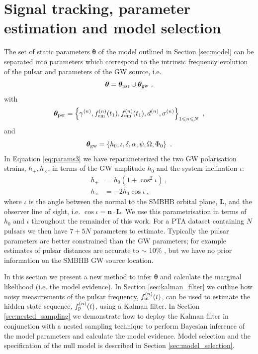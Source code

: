 \documentclass[fleqn,usenatbib,useAMS]{mnras}
\begin{document}
\section{Signal tracking, parameter estimation and model selection} \label{sec:detect}
The set of static parameters $\boldsymbol{\theta}$ of the model outlined in Section \ref{sec:model} can be separated into parameters which correspond to the intrinsic frequency evolution of the pulsar and parameters of the GW source, i.e. 
\begin{equation}
	\boldsymbol{\theta} =  \boldsymbol{\theta}_{\rm psr} \cup \boldsymbol{\theta}_{\rm gw} \ , \label{eq:params1}
\end{equation}
with
\begin{equation}
	\boldsymbol{\theta}_{\rm psr} = \left \{ \gamma^{(n)}, f_{\rm em}^{(n)}(t_1),\dot{f}_{\rm em}^{(n)}(t_1),d^{(n)},\sigma^{(n)}\right\}_{1\leq n \leq N} \ ,
\end{equation}
and
\begin{equation}
	\boldsymbol{\theta}_{\rm gw} = \left \{h_0, \iota, \delta, \alpha, \psi, \Omega, \Phi_0 \right \} \ .  \label{eq:params3}
\end{equation}
In Equation \eqref{eq:params3} we have reparameterized the two GW polarisation strains, $h_{+}, h_{\times}$, in terms of the GW amplitude $h_0$ and the system inclination $\iota$:
\begin{align}
	h_+ &= h_0(1 + \cos^2 \iota) 	\label{eq:hphx} \ ,\\
	h_{\times} &= -2h_0\cos \iota 	\label{eq:hphx2} \ , 
\end{align}
where $\iota$ is the angle between the normal to the SMBHB orbital plane, $\boldsymbol{L}$, and the observer line of sight, i.e. $\cos \iota = \boldsymbol{n} \cdot \boldsymbol{L}$. We use this parametrisation in terms of $h_0$ and $\iota$ throughout the remainder of this work. For a PTA dataset containing $N$ pulsars we then have $7 + 5N$ parameters to estimate. Typically the pulsar parameters are better constrained than the GW parameters; for example estimates of pulsar distances are accurate to $\sim$ 10$\%$ \citep{Cordes2002astro.ph..7156C, Verbiest2012ApJ...755...39V, Desvignes2016,Yao2017}, but we have no prior information on the SMBHB GW source location.  \newline 



In this section we present a new method to infer $\boldsymbol{\theta}$ and calculate the marginal likelihood (i.e. the model evidence). In Section \ref{sec:kalman_filter} we outline how noisy measurements of the pulsar frequency, $f_{\rm m}^{(n)}(t)$, can be used to estimate the hidden state sequence, $f_{\rm p}^{(n)}(t)$, using a Kalman filter. In Section \ref{sec:nested_sampling} we demonstrate how to deploy the Kalman filter in conjunction with a nested sampling technique to perform Bayesian inference of the model parameters and calculate the model evidence. Model selection and the specification of the null model is described in Section \ref{sec:model_selection}. 
\end{document}
